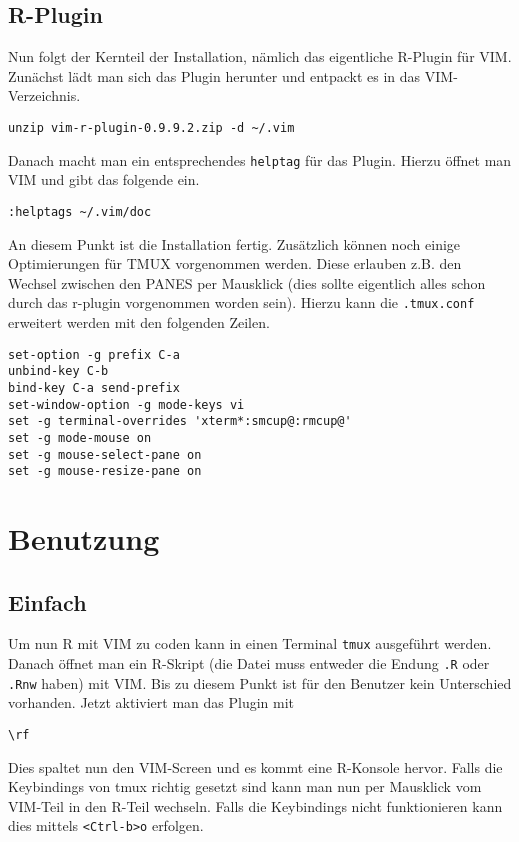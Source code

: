 \documentclass[a4paper,
               10pt,
               fleqn]{article}
\begin{document}
\subsection{R-Plugin}
Nun folgt der Kernteil der Installation, nämlich das eigentliche R-Plugin
für VIM. 
Zunächst lädt man sich das Plugin herunter und entpackt es in das 
VIM-Verzeichnis.
\begin{lstlisting}
unzip vim-r-plugin-0.9.9.2.zip -d ~/.vim
\end{lstlisting}
Danach macht man ein entsprechendes \verb!helptag! für das Plugin.
Hierzu öffnet man VIM und gibt das folgende ein.

\begin{lstlisting}
:helptags ~/.vim/doc
\end{lstlisting}
An diesem Punkt ist die Installation fertig. Zusätzlich können noch einige
Optimierungen für TMUX vorgenommen werden. Diese erlauben z.B. den Wechsel
zwischen den PANES per Mausklick (dies sollte eigentlich alles schon durch
das r-plugin vorgenommen worden sein). Hierzu kann die \verb!.tmux.conf!
erweitert werden mit den folgenden Zeilen.

\begin{lstlisting}
set-option -g prefix C-a
unbind-key C-b
bind-key C-a send-prefix
set-window-option -g mode-keys vi
set -g terminal-overrides 'xterm*:smcup@:rmcup@'
set -g mode-mouse on
set -g mouse-select-pane on
set -g mouse-resize-pane on
\end{lstlisting}

\section{Benutzung}

\subsection{Einfach}
Um nun R mit VIM zu coden kann in einen Terminal \verb!tmux! ausgeführt
werden. Danach öffnet man ein R-Skript (die Datei muss entweder die Endung
\verb!.R! oder \verb!.Rnw! haben) mit VIM. Bis zu diesem Punkt ist für den
Benutzer kein Unterschied vorhanden. Jetzt aktiviert man das Plugin mit
\begin{lstlisting}
\rf
\end{lstlisting}
Dies spaltet nun den VIM-Screen und es kommt eine R-Konsole hervor. Falls
die Keybindings von tmux richtig gesetzt sind kann man nun per Mausklick
vom VIM-Teil in den R-Teil wechseln. Falls die Keybindings nicht funktionieren
kann dies mittels \verb!<Ctrl-b>o! erfolgen.
\end{document}
